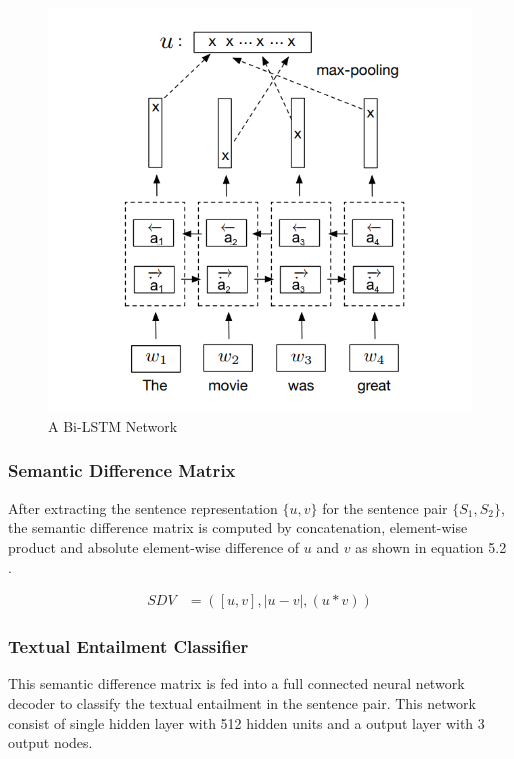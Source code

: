 \documentclass[12pt]{report} %
\begin{document}
	\begin{figure}[!tbp]
		\centering
		\includegraphics[scale=0.50]{image/Bi-LSTM.png}
		\caption{A Bi-LSTM Network \citep{conneau2017supervised}}
		\label{bilstm}
	\end{figure}
	
	\subsubsection{Semantic Difference Matrix}
	
	After extracting the sentence representation $\{u,v\}$  for the sentence pair $\{S_{1},S_{2}\}$, the semantic difference matrix is computed by concatenation, element-wise product and absolute element-wise difference of $u$ and $v$ as shown in equation 5.2 .
	
	\begin{align} 
	SDV & =([u,v],|u - v|,(u \ast v)) 
	\end{align}
	
	\subsubsection{Textual Entailment Classifier}
	
	This semantic difference matrix is fed into a full connected neural network decoder to classify the textual entailment in the sentence pair. This network consist of single hidden layer with 512 hidden units and a output layer with 3 output nodes. 
	
\end{document}

